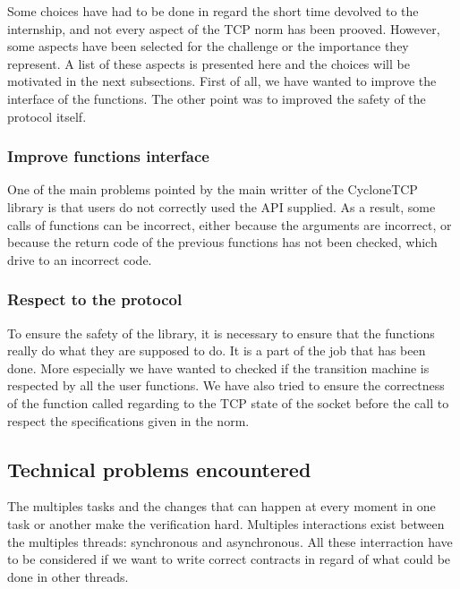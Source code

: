 \documentclass[a4paper, 10pt]{article}
\begin{document}
    Some choices have had to be done in regard the short time devolved to the internship, and
    not every aspect of the TCP norm has been prooved. However, some aspects have been selected
    for the challenge or the importance they represent. A list of these aspects is presented
    here and the choices will be motivated in the next subsections. First of all, we have wanted
    to improve the interface of the functions. The other point was to improved the safety of the
    protocol itself.

    \subsubsection{Improve functions interface}

    One of the main problems pointed by the main writter of the CycloneTCP library is that users
    do not correctly used the API supplied. As a result, some calls of
    functions can be incorrect, either because the arguments are incorrect, or because the
    return code of the previous functions has not been checked, which drive to an
    incorrect code.

    \subsubsection{Respect to the protocol}

    To ensure the safety of the library, it is necessary to ensure that the functions really
    do what they are supposed to do. It is a part of the job that has been done. More
    especially we have wanted to checked if the transition machine is respected by all the
    user functions. We have also tried to ensure the correctness of the function called
    regarding to the TCP state of the socket before the call to respect the specifications
    given in the norm.


    \subsection{Technical problems encountered}

    The multiples tasks and the changes that can happen at every moment in one
    task or another make the verification hard. Multiples interactions exist
    between the multiples threads: synchronous and asynchronous.
    All these interraction have to be considered if we want to write correct contracts
    in regard of what could be done in other threads.
\end{document}
